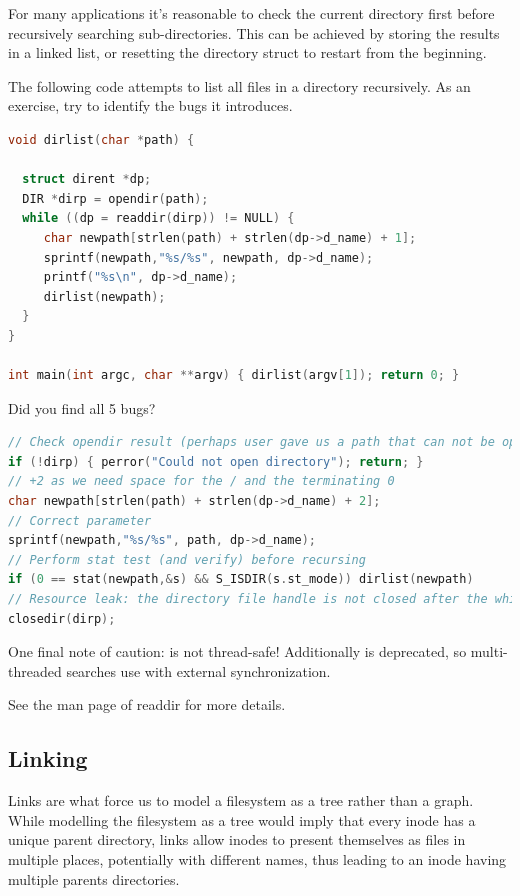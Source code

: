 For many applications it's reasonable to check the current directory first before recursively searching sub-directories. This can be achieved by storing the results in a linked list, or resetting the directory struct to restart from the beginning.

The following code attempts to list all files in a directory recursively. As an exercise, try to identify the bugs it introduces.

\begin{lstlisting}[language=C]
void dirlist(char *path) {

  struct dirent *dp;
  DIR *dirp = opendir(path);
  while ((dp = readdir(dirp)) != NULL) {
     char newpath[strlen(path) + strlen(dp->d_name) + 1];
     sprintf(newpath,"%s/%s", newpath, dp->d_name);
     printf("%s\n", dp->d_name);
     dirlist(newpath);
  }
}

int main(int argc, char **argv) { dirlist(argv[1]); return 0; }
\end{lstlisting}

Did you find all 5 bugs?

\begin{lstlisting}[language=C]
// Check opendir result (perhaps user gave us a path that can not be opened as a directory
if (!dirp) { perror("Could not open directory"); return; }
// +2 as we need space for the / and the terminating 0
char newpath[strlen(path) + strlen(dp->d_name) + 2];
// Correct parameter
sprintf(newpath,"%s/%s", path, dp->d_name);
// Perform stat test (and verify) before recursing
if (0 == stat(newpath,&s) && S_ISDIR(s.st_mode)) dirlist(newpath)
// Resource leak: the directory file handle is not closed after the while loop
closedir(dirp);
\end{lstlisting}

One final note of caution:  is not thread-safe! Additionally  is deprecated, so multi-threaded searches use  with external synchronization.

See the man page of readdir for more details.

\subsection{Linking}

Links are what force us to model a filesystem as a tree rather than a graph. While modelling the filesystem as a tree would imply that every inode has a unique parent directory, links allow inodes to present themselves as files in multiple places, potentially with different names, thus leading to an inode having multiple parents directories.

